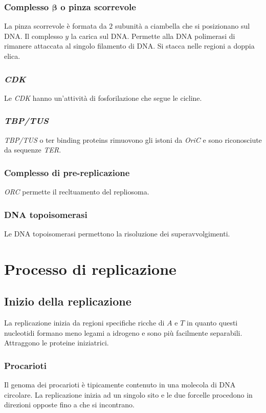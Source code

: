 		\subsubsection{Complesso $\mathbf{\beta}$ o pinza scorrevole}
		La pinza scorrevole \`e formata da $2$ subunit\`a a ciambella che si posizionano sul DNA.
		Il complesso $y$ la carica sul DNA.
		Permette alla DNA polimerasi di rimanere attaccata al singolo filamento di DNA.
		Si stacca nelle regioni a doppia elica.

		\subsubsection{\emph{CDK}}
		Le \emph{CDK} hanno un'attivit\`a di fosforilazione che segue le cicline.

		\subsubsection{\emph{TBP/TUS}}
		\emph{TBP/TUS} o ter binding proteins rimuovono gli istoni da \emph{OriC} e sono riconosciute da sequenze \emph{TER}.

		\subsubsection{Complesso di pre-replicazione}
		\emph{ORC} permette il recltuamento del repliosoma.

		\subsubsection{DNA topoisomerasi}
		Le DNA topoisomerasi permettono la risoluzione dei superavvolgimenti.




\section{Processo di replicazione}

	\subsection{Inizio della replicazione}
	La replicazione inizia da regioni specifiche ricche di $A$ e $T$ in quanto questi nucleotidi formano meno legami a idrogeno e sono pi\`u facilmente separabili.
	Attraggono le proteine iniziatrici.

		\subsubsection{Procarioti}
		Il genoma dei procarioti \`e tipicamente contenuto in una molecola di DNA circolare.
		La replicazione inizia ad un singolo sito e le due forcelle procedono in direzioni opposte fino a che si incontrano.
		
